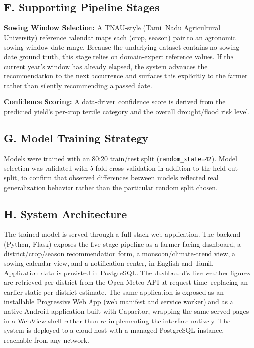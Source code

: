 \documentclass[12pt,a4paper,twocolumn]{article}
\begin{document}
\subsection*{F. Supporting Pipeline Stages}

\textbf{Sowing Window Selection:} A TNAU-style (Tamil Nadu Agricultural University)
reference calendar maps each (crop, season) pair to an agronomic sowing-window date
range. Because the underlying dataset contains no sowing-date ground truth, this
stage relies on domain-expert reference values. If the current year's window has
already elapsed, the system advances the recommendation to the next occurrence and
surfaces this explicitly to the farmer rather than silently recommending a passed
date.

\textbf{Confidence Scoring:} A data-driven confidence score is derived from the
predicted yield's per-crop tertile category and the overall drought/flood risk level.

\subsection*{G. Model Training Strategy}

Models were trained with an 80:20 train/test split (\texttt{random\_state=42}).
Model selection was validated with 5-fold cross-validation in addition to the
held-out split, to confirm that observed differences between models reflected real
generalization behavior rather than the particular random split chosen.

\subsection*{H. System Architecture}

The trained model is served through a full-stack web application. The backend
(Python, Flask) exposes the five-stage pipeline as a farmer-facing dashboard, a
district/crop/season recommendation form, a monsoon/climate-trend view, a sowing
calendar view, and a notification center, in English and Tamil. Application data is
persisted in PostgreSQL. The dashboard's live weather figures are retrieved per
district from the Open-Meteo API at request time, replacing an earlier static
per-district estimate. The same application is exposed as an installable Progressive
Web App (web manifest and service worker) and as a native Android application built
with Capacitor, wrapping the same served pages in a WebView shell rather than
re-implementing the interface natively. The system is deployed to a cloud host with a
managed PostgreSQL instance, reachable from any network.
\end{document}
